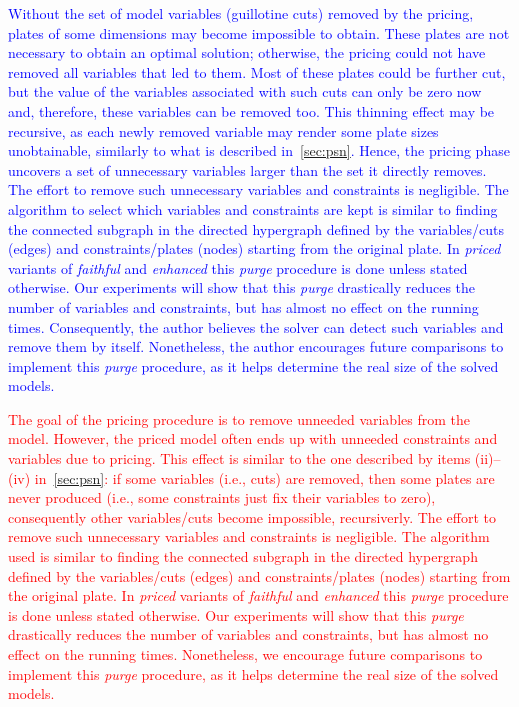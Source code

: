 \documentclass[ppgc,tese,english,formais,babel]{iiufrgs}
\newif\iffinalversion
\newcommand{\newtext}[1]{\iffinalversion%
#1%
\else%
\textcolor{blue}{#1}%
\fi%
}
\newcommand{\oldtext}[1]{\iffinalversion%
\else%
\textcolor{red}{#1}%
\fi%
}
\begin{document}
\newtext{
Without the set of model variables (guillotine cuts) removed by the pricing, plates of some dimensions may become impossible to obtain.
These plates are not necessary to obtain an optimal solution; otherwise, the pricing could not have removed all variables that led to them.
Most of these plates could be further cut, but the value of the variables associated with such cuts can only be zero now and, therefore, these variables can be removed too.
This thinning effect may be recursive, as each newly removed variable may render some plate sizes unobtainable, similarly to what is described in~\cref{sec:psn}.
Hence, the pricing phase uncovers a set of unnecessary variables larger than the set it directly removes.
The effort to remove such unnecessary variables and constraints is negligible.
The algorithm to select which variables and constraints are kept is similar to finding the connected subgraph in the directed hypergraph defined by the variables/cuts (edges) and constraints/plates (nodes) starting from the original plate.
In \emph{priced} variants of \emph{faithful} and \emph{enhanced} this \emph{purge} procedure is done unless stated otherwise.
Our experiments will show that this \emph{purge} drastically reduces the number of variables and constraints, but has almost no effect on the running times.
Consequently, the author believes the solver can detect such variables and remove them by itself.
Nonetheless, the author encourages future comparisons to implement this \emph{purge} procedure, as it helps determine the real size of the solved models.
}

\oldtext{The goal of the pricing procedure is to remove unneeded variables from the model. However, the priced model often ends up with unneeded constraints and variables due to pricing. This effect is similar to the one described by items (ii)--(iv) in~\autoref{sec:psn}: if some variables (i.e., cuts) are removed, then some plates are never produced (i.e., some constraints just fix their variables to zero), consequently other variables/cuts become impossible, recursiverly. The effort to remove such unnecessary variables and constraints is negligible. The algorithm used is similar to finding the connected subgraph in the directed hypergraph defined by the variables/cuts (edges) and constraints/plates (nodes) starting from the original plate. In \emph{priced} variants of \emph{faithful} and \emph{enhanced} this \emph{purge} procedure is done unless stated otherwise. Our experiments will show that this \emph{purge} drastically reduces the number of variables and constraints, but has almost no effect on the running times. Nonetheless, we encourage future comparisons to implement this \emph{purge} procedure, as it helps determine the real size of the solved models.}
\end{document}
